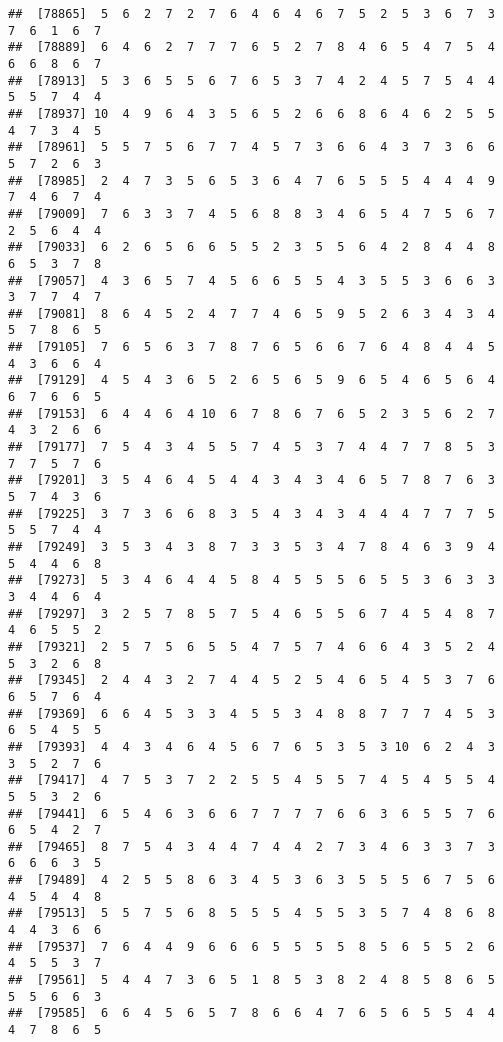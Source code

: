 \documentclass[
]{book}
\begin{document}
\begin{verbatim}
##  [78865]  5  6  2  7  2  7  6  4  6  4  6  7  5  2  5  3  6  7  3  7  6  1  6  7
##  [78889]  6  4  6  2  7  7  7  6  5  2  7  8  4  6  5  4  7  5  4  6  6  8  6  7
##  [78913]  5  3  6  5  5  6  7  6  5  3  7  4  2  4  5  7  5  4  4  5  5  7  4  4
##  [78937] 10  4  9  6  4  3  5  6  5  2  6  6  8  6  4  6  2  5  5  4  7  3  4  5
##  [78961]  5  5  7  5  6  7  7  4  5  7  3  6  6  4  3  7  3  6  6  5  7  2  6  3
##  [78985]  2  4  7  3  5  6  5  3  6  4  7  6  5  5  5  4  4  4  9  7  4  6  7  4
##  [79009]  7  6  3  3  7  4  5  6  8  8  3  4  6  5  4  7  5  6  7  2  5  6  4  4
##  [79033]  6  2  6  5  6  6  5  5  2  3  5  5  6  4  2  8  4  4  8  6  5  3  7  8
##  [79057]  4  3  6  5  7  4  5  6  6  5  5  4  3  5  5  3  6  6  3  3  7  7  4  7
##  [79081]  8  6  4  5  2  4  7  7  4  6  5  9  5  2  6  3  4  3  4  5  7  8  6  5
##  [79105]  7  6  5  6  3  7  8  7  6  5  6  6  7  6  4  8  4  4  5  4  3  6  6  4
##  [79129]  4  5  4  3  6  5  2  6  5  6  5  9  6  5  4  6  5  6  4  6  7  6  6  5
##  [79153]  6  4  4  6  4 10  6  7  8  6  7  6  5  2  3  5  6  2  7  4  3  2  6  6
##  [79177]  7  5  4  3  4  5  5  7  4  5  3  7  4  4  7  7  8  5  3  7  7  5  7  6
##  [79201]  3  5  4  6  4  5  4  4  3  4  3  4  6  5  7  8  7  6  3  5  7  4  3  6
##  [79225]  3  7  3  6  6  8  3  5  4  3  4  3  4  4  4  7  7  7  5  5  5  7  4  4
##  [79249]  3  5  3  4  3  8  7  3  3  5  3  4  7  8  4  6  3  9  4  5  4  4  6  8
##  [79273]  5  3  4  6  4  4  5  8  4  5  5  5  6  5  5  3  6  3  3  3  4  4  6  4
##  [79297]  3  2  5  7  8  5  7  5  4  6  5  5  6  7  4  5  4  8  7  4  6  5  5  2
##  [79321]  2  5  7  5  6  5  5  4  7  5  7  4  6  6  4  3  5  2  4  5  3  2  6  8
##  [79345]  2  4  4  3  2  7  4  4  5  2  5  4  6  5  4  5  3  7  6  6  5  7  6  4
##  [79369]  6  6  4  5  3  3  4  5  5  3  4  8  8  7  7  7  4  5  3  6  5  4  5  5
##  [79393]  4  4  3  4  6  4  5  6  7  6  5  3  5  3 10  6  2  4  3  3  5  2  7  6
##  [79417]  4  7  5  3  7  2  2  5  5  4  5  5  7  4  5  4  5  5  4  5  5  3  2  6
##  [79441]  6  5  4  6  3  6  6  7  7  7  7  6  6  3  6  5  5  7  6  6  5  4  2  7
##  [79465]  8  7  5  4  3  4  4  7  4  4  2  7  3  4  6  3  3  7  3  6  6  6  3  5
##  [79489]  4  2  5  5  8  6  3  4  5  3  6  3  5  5  5  6  7  5  6  4  5  4  4  8
##  [79513]  5  5  7  5  6  8  5  5  5  4  5  5  3  5  7  4  8  6  8  4  4  3  6  6
##  [79537]  7  6  4  4  9  6  6  6  5  5  5  5  8  5  6  5  5  2  6  4  5  5  3  7
##  [79561]  5  4  4  7  3  6  5  1  8  5  3  8  2  4  8  5  8  6  5  5  5  6  6  3
##  [79585]  6  6  4  5  6  5  7  8  6  6  4  7  6  5  6  5  5  4  4  4  7  8  6  5

\end{verbatim}
\end{document}
